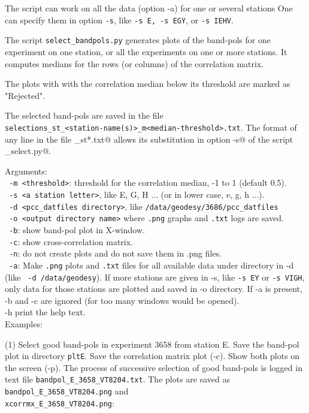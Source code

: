 \documentclass[preprint]{aastex}
\begin{document}
The script can work on all the data (option -a) for one or several stations One can specify them in option \texttt{-s}, like \texttt{-s E, -s EGY}, or \texttt{-s IEHV}.

The script \texttt{select\_bandpols.py} generates plots of the band-pols for one experiment on one station, or all the experiments on one or more stations. It computes medians for the rows (or columns) of the correlation matrix.

The plots with with the correlation median below its threshold are marked as "Rejected". 

The selected band-pols are saved in the file \\
\verb$selections_st_<station-name(s)>_m<median-threshold>.txt$. 
The format of any line in the file \verb@selections_st*.txt@ allows its substitution in option \verb@-s@ of the script \verb@pcc_select.py@.


Arguments: \\
\texttt{  -m <threshold>}:    threshold for the correlation median, -1 to 1 (default 0.5). \\
\texttt{  -s <a station letter>}, like E, G, H ... (or in lower case, e, g, h ...). \\
\texttt{  -d <pcc\_datfiles directory>}, like \texttt{/data/geodesy/3686/pcc\_datfiles} \\
\texttt{  -o <output directory name>} where \texttt{.png} graphs and \texttt{.txt} logs are saved. \\
\texttt{  -b}: show band-pol plot in X-window. \\
\texttt{  -c}: show cross-correlation matrix. \\
\texttt{  -n}: do not create plots and do not save them in .png files. \\
\texttt{  -a}: Make \texttt{.png} plots and \texttt{.txt} files for all available data under directory in -d (like \texttt{  -d /data/geodesy}). If more stations are given in -s, like \texttt{-s EY} or \texttt{-s VIGH}, only data for those stations are plotted and saved in -o directory. If -a is present, -b and -c are ignored (for too many windows would be opened). \\
  -h print the help text. \\

Examples:

(1) Select good band-pols in experiment 3658 from station E. Save the band-pol
plot in directory \texttt{pltE}. Save the correlation matrix plot (-c). Show both plots
on the screen (-p). 
The process of successive selection of good band-pols is logged in text file 
\verb$bandpol_E_3658_VT8204.txt$. 
The plots are saved as \verb$bandpol_E_3658_VT8204.png$ and \\
\verb$xcorrmx_E_3658_VT8204.png$: 
\end{document}
